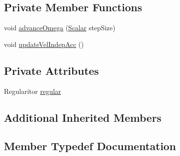 \subsection*{Private Member Functions}
\begin{DoxyCompactItemize}
\item 
void \mbox{\hyperlink{classregu_system_3_01_newtonian_3_01typename_01_evolved_data_1_1_scalar_01_4_00_01_evolved_data_00_01_regularitor_01_4_a114c39dbc724ee6cda9f2b3da8d1ff3c}{advance\+Omega}} (\mbox{\hyperlink{classregu_system_3_01_newtonian_3_01typename_01_evolved_data_1_1_scalar_01_4_00_01_evolved_data_00_01_regularitor_01_4_a6993f135075541f441a7642845b183a5}{Scalar}} step\+Size)
\item 
void \mbox{\hyperlink{classregu_system_3_01_newtonian_3_01typename_01_evolved_data_1_1_scalar_01_4_00_01_evolved_data_00_01_regularitor_01_4_a90719aee4d16176e982461d1f4d2fd33}{update\+Vel\+Indep\+Acc}} ()
\end{DoxyCompactItemize}
\subsection*{Private Attributes}
\begin{DoxyCompactItemize}
\item 
Regularitor \mbox{\hyperlink{classregu_system_3_01_newtonian_3_01typename_01_evolved_data_1_1_scalar_01_4_00_01_evolved_data_00_01_regularitor_01_4_a56f2b9c617d94ca6e1d5ae5cc97fef0f}{regular}}
\end{DoxyCompactItemize}
\subsection*{Additional Inherited Members}


\subsection{Member Typedef Documentation}
\mbox{\label{classregu_system_3_01_newtonian_3_01typename_01_evolved_data_1_1_scalar_01_4_00_01_evolved_data_00_01_regularitor_01_4_a26da8a1ed92e5aced3615da524ef37b3}} 
